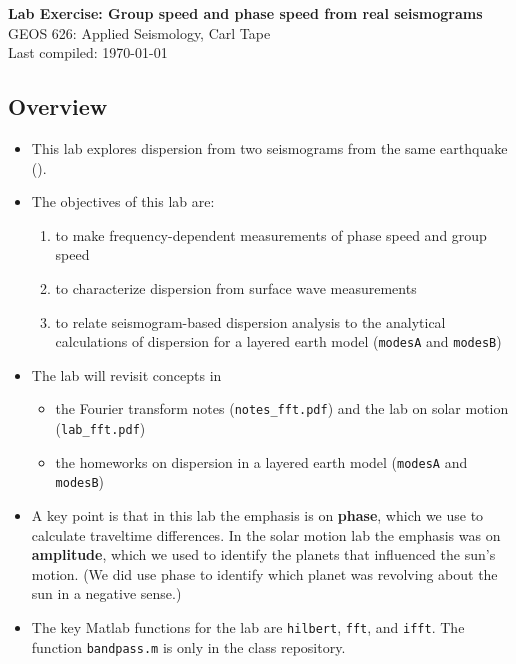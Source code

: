 \documentclass[11pt,titlepage,fleqn]{article}
\begin{document}

\begin{spacing}{1.2}
\centering
{\large \bf Lab Exercise: Group speed and phase speed from real seismograms} \\
GEOS 626: Applied Seismology, Carl Tape \\
Last compiled: \today \\
\end{spacing}


\subsection*{Overview}

\begin{itemize}
\item This lab explores dispersion from two seismograms from the same earthquake ().

\item The objectives of this lab are:
%
\begin{enumerate}
\item to make frequency-dependent measurements of phase speed and group speed
\item to characterize dispersion from surface wave measurements
\item to relate seismogram-based dispersion analysis to the analytical calculations of dispersion for a layered earth model (\verb+modesA+ and \verb+modesB+)
\end{enumerate}

\item The lab will revisit concepts in
%
\begin{itemize}
\item the Fourier transform notes (\verb+notes_fft.pdf+) and the lab on solar motion (\verb+lab_fft.pdf+)
\item the homeworks on dispersion in a layered earth model (\verb+modesA+ and \verb+modesB+)
\end{itemize}

\item A key point is that in this lab the emphasis is on {\bf phase}, which we use to calculate traveltime differences. In the solar motion lab the emphasis was on {\bf amplitude}, which we used to identify the planets that influenced the sun's motion. (We did use phase to identify which planet was revolving about the sun in a negative sense.)

\item The key Matlab functions for the lab are \verb+hilbert+, \verb+fft+, and \verb+ifft+. The function \verb+bandpass.m+ is only in the class repository.

\end{itemize}
\end{document}
